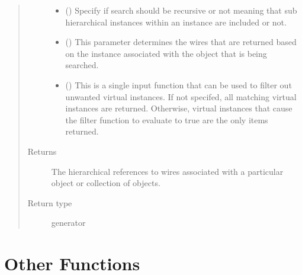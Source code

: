 \documentclass[letterpaper,10pt,english,openany,oneside]{sphinxmanual}
\begin{document}
\begin{fulllineitems}
\begin{quote}
\begin{description}
\begin{itemize}
\item {} 
 () \textendash{} Specify if search should be recursive or not meaning that sub hierarchical instances within an instance are
included or not.

\item {} 
 () \textendash{} This parameter determines the wires that are returned based on the instance associated with the object that is
being searched.

\item {} 
 () \textendash{} This is a single input function that can be used to filter out unwanted virtual instances. If not specifed, all
matching virtual instances are returned. Otherwise, virtual instances that cause the filter function to evaluate
to true are the only items returned.

\end{itemize}

\item[{Returns}] \leavevmode
{} \textendash{} The hierarchical references to wires associated with a particular object or collection of objects.

\item[{Return type}] \leavevmode
generator

\end{description}\end{quote}

\end{fulllineitems}



\section{Other Functions}
\label{\detokenize{reference/classes/index:other-functions}}
\end{document}
